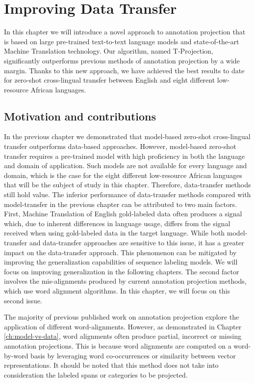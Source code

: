 \chapter[Improving Data Transfer]{Improving Data Transfer}
\label{ch:data-transfer}


In this chapter we will introduce a novel approach to annotation projection that is based on large pre-trained text-to-text language models and state-of-the-art Machine Translation technology. Our algorithm, named T-Projection, significantly outperforms previous methods of annotation projection by a wide margin. Thanks to this new approach, we have achieved the best results to date for zero-shot cross-lingual transfer between English and eight different low-resource African languages.

\section{Motivation and contributions}

In the previous chapter we demonstrated that model-based zero-shot cross-lingual transfer outperforms data-based approaches. However, model-based zero-shot transfer requires a pre-trained model with high proficiency in both the language and domain of application. Such models are not available for every language and domain, which is the case for the eight different low-resource African languages that will be the subject of study in this chapter. Therefore, data-transfer methods still hold value. The inferior performance of data-transfer methods compared with model-transfer in the previous chapter can be attributed to two main factors. First, Machine Translation of English gold-labeled data often produces a signal which, due to inherent differences in language usage, differs from the signal received when using gold-labeled data in the target language. While both model-transfer and data-transfer approaches are sensitive to this issue, it has a greater impact on the data-transfer approach. This phenomenon can be mitigated by improving the generalization capabilities of sequence labeling models. We will focus on improving generalization in the following chapters. The second factor involves the mis-alignments produced by current annotation projection methods, which use word alignment algorithms. In this chapter, we will focus on this second issue. 


The majority of previous published work on annotation projection explore the application of different word-alignments. However, as demonstrated in Chapter \ref{ch:model-vs-data}, word alignments often produce partial, incorrect or missing annotation projections. This is because word alignments are computed on a word-by-word basis by leveraging word co-occurrences or similarity between vector representations.  It should be noted that this method does not take into consideration the labeled spans or categories to be projected. 

